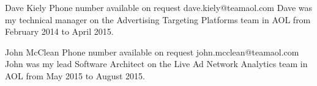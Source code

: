 
\begin{multicols}{2}

    \cvreferee
    {Dave Kiely}
    {Phone number available on request}
    {dave.kiely@teamaol.com}
    {Dave was my technical manager on the Advertising Targeting Platforms team in AOL from February 2014 to April 2015.}
    
    \cvreferee
    {John McClean}
    {Phone number available on request}
    {john.mcclean@teamaol.com}
    {John was my lead Software Architect on the Live Ad Network Analytics team in AOL from May 2015 to August 2015.}
    
\end{multicols}